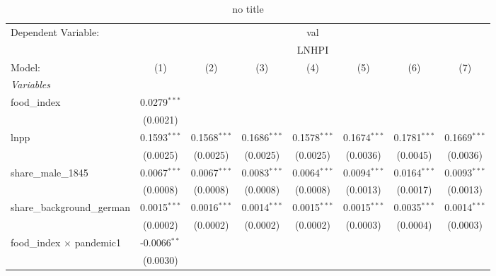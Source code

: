 
\begin{table}[htbp]
   \caption{no title}
   \centering
   \begin{tabular}{lccccccc}
      \tabularnewline \midrule \midrule
      Dependent Variable: & \multicolumn{7}{c}{val}\\
       & \multicolumn{7}{c}{LNHPI} \\ 
      Model:                                     & (1)            & (2)            & (3)            & (4)            & (5)            & (6)             & (7)\\  
      \midrule
      \emph{Variables}\\
      food\_index                                & 0.0279$^{***}$ &                &                &                &                &                 &   \\   
                                                 & (0.0021)       &                &                &                &                &                 &   \\   
      lnpp                                       & 0.1593$^{***}$ & 0.1568$^{***}$ & 0.1686$^{***}$ & 0.1578$^{***}$ & 0.1674$^{***}$ & 0.1781$^{***}$  & 0.1669$^{***}$\\   
                                                 & (0.0025)       & (0.0025)       & (0.0025)       & (0.0025)       & (0.0036)       & (0.0045)        & (0.0036)\\   
      share\_male\_1845                          & 0.0067$^{***}$ & 0.0067$^{***}$ & 0.0083$^{***}$ & 0.0064$^{***}$ & 0.0094$^{***}$ & 0.0164$^{***}$  & 0.0093$^{***}$\\   
                                                 & (0.0008)       & (0.0008)       & (0.0008)       & (0.0008)       & (0.0013)       & (0.0017)        & (0.0013)\\   
      share\_background\_german                  & 0.0015$^{***}$ & 0.0016$^{***}$ & 0.0014$^{***}$ & 0.0015$^{***}$ & 0.0015$^{***}$ & 0.0035$^{***}$  & 0.0014$^{***}$\\   
                                                 & (0.0002)       & (0.0002)       & (0.0002)       & (0.0002)       & (0.0003)       & (0.0004)        & (0.0003)\\   
      food\_index $\times$ pandemic1             & -0.0066$^{**}$ &                &                &                &                &                 &   \\   
                                                 & (0.0030)       &                &                &                &                &                 &   \\   

\end{tabular}
\end{table}

